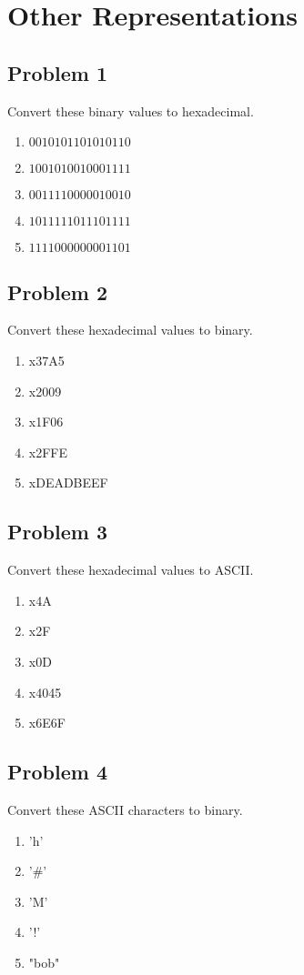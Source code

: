 \documentclass{article}
\begin{document}
\section*{Other Representations}
\subsection*{Problem 1}
Convert these binary values to hexadecimal.
\begin{enumerate}[label=\alph*.]
    \item $0010 1011 0101 0110$
    \item $1001 0100 1000 1111$
    \item $0011 1100 0001 0010$
    \item $1011 1110 1110 1111$
    \item $1111 0000 0000 1101$
\end{enumerate}

\subsection*{Problem 2}
Convert these hexadecimal values to binary.
\begin{enumerate}[label=\alph*.]
    \item x37A5
    \item x2009
    \item x1F06
    \item x2FFE
    \item xDEADBEEF
\end{enumerate}

\subsection*{Problem 3}
Convert these hexadecimal values to ASCII.
\begin{enumerate}[label=\alph*.]
    \item x4A
    \item x2F
    \item x0D
    \item x4045
    \item x6E6F
\end{enumerate}

\subsection*{Problem 4}
Convert these ASCII characters to binary.
\begin{enumerate}[label=\alph*.]
    \item 'h'
    \item '\#'
    \item 'M'
    \item '!'
    \item "bob"
\end{enumerate}
\end{document}
